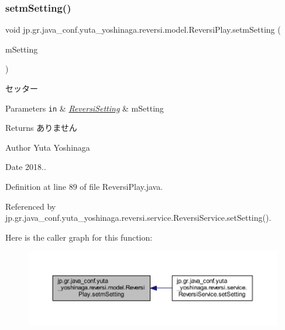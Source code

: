 \subsubsection{\texorpdfstring{setm\+Setting()}{setmSetting()}}
{\footnotesize\ttfamily void jp.\+gr.\+java\+\_\+conf.\+yuta\+\_\+yoshinaga.\+reversi.\+model.\+Reversi\+Play.\+setm\+Setting (\begin{DoxyParamCaption}\item[{\hyperlink{classjp_1_1gr_1_1java__conf_1_1yuta__yoshinaga_1_1reversi_1_1model_1_1_reversi_setting}{Reversi\+Setting}}]{m\+Setting }\end{DoxyParamCaption})}



セッター 


\begin{DoxyParams}[1]{Parameters}
\mbox{\tt in}  & {\em \hyperlink{classjp_1_1gr_1_1java__conf_1_1yuta__yoshinaga_1_1reversi_1_1model_1_1_reversi_setting}{Reversi\+Setting}} & m\+Setting \\
\hline
\end{DoxyParams}
\begin{DoxyReturn}{Returns}
ありません 
\end{DoxyReturn}
\begin{DoxyAuthor}{Author}
Yuta Yoshinaga 
\end{DoxyAuthor}
\begin{DoxyDate}{Date}
2018.. 
\end{DoxyDate}


Definition at line 89 of file Reversi\+Play.\+java.



Referenced by jp.\+gr.\+java\+\_\+conf.\+yuta\+\_\+yoshinaga.\+reversi.\+service.\+Reversi\+Service.\+set\+Setting().

Here is the caller graph for this function\+:
\nopagebreak
\begin{figure}[H]
\begin{center}
\leavevmode
\includegraphics[width=350pt]{classjp_1_1gr_1_1java__conf_1_1yuta__yoshinaga_1_1reversi_1_1model_1_1_reversi_play_a8c791a59db891596f7358ddf66b1c2d9_icgraph}
\end{center}
\end{figure}
\mbox{\label{classjp_1_1gr_1_1java__conf_1_1yuta__yoshinaga_1_1reversi_1_1model_1_1_reversi_play_ac0a21805d156fefa61576a64715ac778}} 
